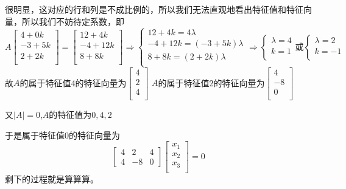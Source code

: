 \documentclass[lang=cn,10pt]{elegantbook}
\begin{document}
\begin{solution}
	
	很明显，这对应的行和列是不成比例的，所以我们无法直观地看出特征值和特征向量，所以我们不妨待定系数，即
	\begin{equation*}
		A\left[ \begin{array}{c}
			4+0k\\
			-3+5k\\
			2+2k\\
		\end{array} \right] =\left[ \begin{array}{c}
			12+4k\\
			-4+12k\\
			8+8k\\
		\end{array} \right] \Rightarrow \begin{cases}
			12+4k=4\lambda\\
			-4+12k=\left( -3+5k \right) \lambda\\
			8+8k=\left( 2+2k \right) \lambda\\
		\end{cases}\Rightarrow \begin{cases}
			\lambda =4\\
			k=1\\
		\end{cases}\text{或}\begin{cases}
			\lambda =2\\
			k=-1\\
		\end{cases}
	\end{equation*}
	故$A$的属于特征值4的特征向量为$\left[ \begin{array}{c}
		4\\
		2\\
		4\\
	\end{array} \right] $
	$A$的属于特征值2的特征向量为$\left[ \begin{array}{c}
		4\\
		-8\\
		0\\
	\end{array} \right] $
	
	又$|A|=0$,$A$的特征值为$0,4,2$
	
	于是属于特征值0的特征向量为
	\begin{equation*}
		\begin{bmatrix}
			4& 2 & 4\\
			4& -8  &0
		\end{bmatrix}
		\left[ \begin{array}{c}
			x_1\\
			x_2\\
			x_3\\
		\end{array} \right] =0
	\end{equation*}
	剩下的过程就是算算算。
\end{solution}
\end{document}
